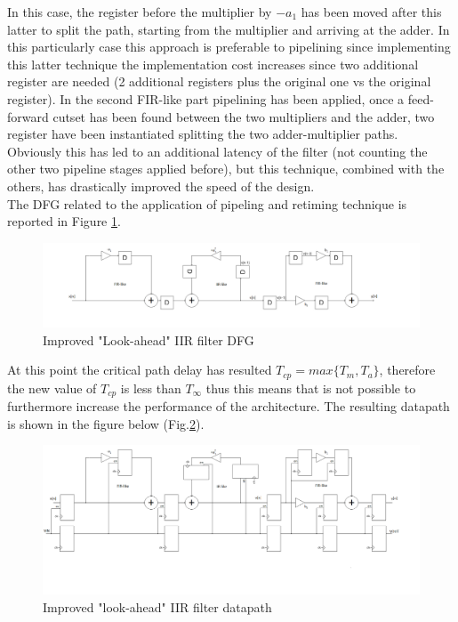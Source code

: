 \documentclass[a4paper, titlepage]{article}
\begin{document}
In this case, the register before the multiplier by $-a_1$ has been moved after this latter to split the path, starting from the multiplier and arriving at the adder. In this particularly case this approach is preferable to pipelining since implementing this latter technique the implementation cost increases since two additional register are needed (2 additional registers plus the original one vs the original register).
\newline
In the second FIR-like part pipelining has been applied, once a feed-forward cutset has been found between the two multipliers and the adder, two register have been instantiated splitting the two adder-multiplier paths. Obviously this has led to an additional latency of the filter (not counting the other two pipeline stages applied before), but this technique, combined with the others, has drastically improved the speed of the design.\\The DFG related to the application of pipeling and retiming technique is reported in Figure \ref{fig:dfg_la_ret_pp_filt}.
\newpage
 \begin{figure} [h]
\centering
	\includegraphics[scale=0.3]{DFG_filter_la_ret_pp.png}
	\caption{Improved "Look-ahead" IIR filter DFG}
	\label{fig:dfg_la_ret_pp_filt}
\end{figure}   
\noindent
At this point the critical path delay has resulted $T_{cp} =max\{T_m,T_a\}$, therefore  the new value of $T_{cp}$ is less than $T_{\infty}$ thus this means that is not possible to furthermore increase the performance of the architecture.
\newline The resulting datapath is shown in the figure below (Fig.\ref{fig:la_filt_ret_pp}).
 \begin{figure} [h]
\centering
	\includegraphics[scale=0.3]{filter_la_ret_pp.png}
	\caption{Improved "look-ahead" IIR filter datapath}
	\label{fig:la_filt_ret_pp}
\end{figure}
\end{document}
